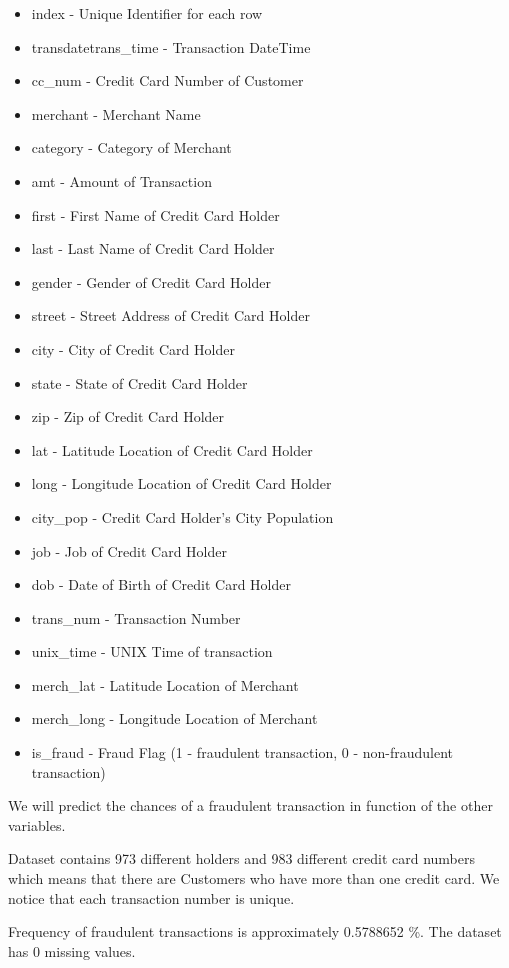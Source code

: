 \documentclass[
]{report}
\providecommand{\tightlist}{%
  \setlength{\itemsep}{0pt}\setlength{\parskip}{0pt}}
\begin{document}
\begin{itemize}
\tightlist
\item
  index - Unique Identifier for each row
\item
  transdatetrans\_time - Transaction DateTime
\item
  cc\_num - Credit Card Number of Customer
\item
  merchant - Merchant Name
\item
  category - Category of Merchant
\item
  amt - Amount of Transaction
\item
  first - First Name of Credit Card Holder
\item
  last - Last Name of Credit Card Holder
\item
  gender - Gender of Credit Card Holder
\item
  street - Street Address of Credit Card Holder
\item
  city - City of Credit Card Holder
\item
  state - State of Credit Card Holder
\item
  zip - Zip of Credit Card Holder
\item
  lat - Latitude Location of Credit Card Holder
\item
  long - Longitude Location of Credit Card Holder
\item
  city\_pop - Credit Card Holder's City Population
\item
  job - Job of Credit Card Holder
\item
  dob - Date of Birth of Credit Card Holder
\item
  trans\_num - Transaction Number
\item
  unix\_time - UNIX Time of transaction
\item
  merch\_lat - Latitude Location of Merchant
\item
  merch\_long - Longitude Location of Merchant
\item
  is\_fraud - Fraud Flag (1 - fraudulent transaction, 0 - non-fraudulent
  transaction)
\end{itemize}

We will predict the chances of a fraudulent transaction in function of
the other variables.

Dataset contains 973 different holders and 983 different credit card
numbers which means that there are Customers who have more than one
credit card. We notice that each transaction number is unique.

Frequency of fraudulent transactions is approximately 0.5788652 \%. The
dataset has 0 missing values.
\end{document}
